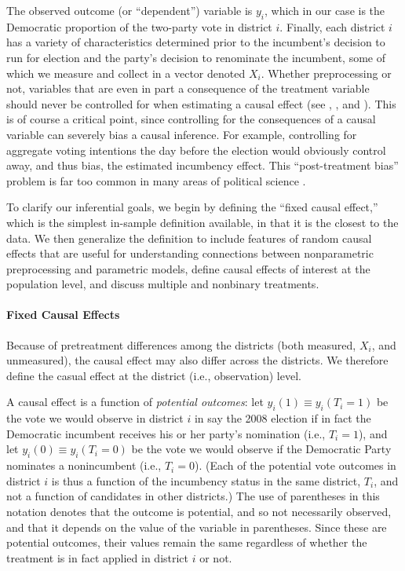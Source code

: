 \documentclass[11pt,titlepage]{article}
\begin{document}
The observed outcome (or ``dependent'') variable is $y_i$, which in
our case is the Democratic proportion of the two-party vote in
district $i$.  Finally, each district $i$ has a variety of
characteristics determined prior to the incumbent's decision to run
for election and the party's decision to renominate the incumbent,
some of which we measure and collect in a vector denoted $X_i$.
Whether preprocessing or not, variables that are even in part a
consequence of the treatment variable should never be controlled for
when estimating a causal effect (see \citealt[][Section 4.2]{Cox58},
\citealt[][]{Rosenbaum84}, and \citealt[][pp. 73--4]{Rosenbaum02}).  This is
of course a critical point, since controlling for the consequences of
a causal variable can severely bias a causal inference.  For example,
controlling for aggregate voting intentions the day before the
election would obviously control away, and thus bias, the estimated
incumbency effect.  This ``post-treatment bias'' problem is far too
common in many areas of political science \citep{KinZen06b}.

To clarify our inferential goals, we begin by defining the ``fixed
causal effect,'' which is the simplest in-sample definition available,
in that it is the closest to the data.  We then generalize the
definition to include features of random causal effects that are
useful for understanding connections between nonparametric
preprocessing and parametric models, define causal effects of interest
at the population level, and discuss multiple and nonbinary
treatments.

\paragraph{Fixed Causal Effects}
Because of pretreatment differences among the districts (both
measured, $X_i$, and unmeasured), the causal effect may also differ
across the districts.  We therefore define the casual effect at the
district (i.e., observation) level.

A causal effect is a function of \emph{potential outcomes}: let
$y_i(1)\equiv y_i(T_i=1)$ be the vote we would observe in district $i$
in say the 2008 election if in fact the Democratic incumbent receives
his or her party's nomination (i.e., $T_i=1$), and let $y_i(0)\equiv
y_i(T_i=0)$ be the vote we would observe if the Democratic Party
nominates a nonincumbent (i.e., $T_i=0$).  (Each of the potential vote
outcomes in district $i$ is thus a function of the incumbency status
in the same district, $T_i$, and not a function of candidates in other
districts.)  The use of parentheses in this notation denotes that the
outcome is potential, and so not necessarily observed, and that it
depends on the value of the variable in parentheses.  Since these are
potential outcomes, their values remain the same regardless of whether
the treatment is in fact applied in district $i$ or not.
\end{document}
